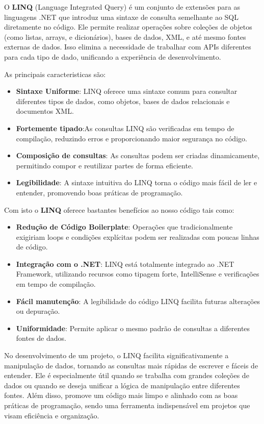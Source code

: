 \documentclass[11pt]{scrartcl} %
\begin{document}
O \textbf{LINQ} (Language Integrated Query) é um conjunto de extensões para as linguagens .NET que introduz uma sintaxe de consulta semelhante ao SQL diretamente no código. Ele permite realizar operações sobre coleções de objetos (como listas, arrays, e dicionários), bases de dados, XML, e até mesmo fontes externas de dados. Isso elimina a necessidade de trabalhar com APIs diferentes para cada tipo de dado, unificando a experiência de desenvolvimento.

As principais caracteristicas são:
\begin{itemize}
	\item \textbf{Sintaxe Uniforme}: 	LINQ oferece uma sintaxe comum para consultar diferentes tipos de dados, como objetos, bases de dados relacionais e documentos XML.
	\item \textbf{Fortemente tipado}:As consultas LINQ são verificadas em tempo de compilação, reduzindo erros e proporcionando maior segurança no código.
	\item \textbf{Composição de consultas}: As consultas podem ser criadas dinamicamente, permitindo compor e reutilizar partes de forma eficiente.
	\item \textbf{Legibilidade}: A sintaxe intuitiva do LINQ torna o código mais fácil de ler e entender, promovendo boas práticas de programação.
\end{itemize}

Com isto o \textbf{LINQ} oferece bastantes benefícios ao nosso código tais como:
\begin{itemize}
	\item \textbf{Redução de Código Boilerplate}: Operações que tradicionalmente exigiriam loops e condições explícitas podem ser realizadas com poucas linhas de código.
	\item \textbf{Integração com o .NET}: LINQ está totalmente integrado ao .NET Framework, utilizando recursos como tipagem forte, IntelliSense e verificações em tempo de compilação.
	\item \textbf{Fácil manutenção}: A legibilidade do código LINQ facilita futuras alterações ou depuração.
	\item \textbf{Uniformidade}: Permite aplicar o mesmo padrão de consultas a diferentes fontes de dados.
\end{itemize}

No desenvolvimento de um projeto, o LINQ facilita significativamente a manipulação de dados, tornando as consultas mais rápidas de escrever e fáceis de entender. Ele é especialmente útil quando se trabalha com grandes coleções de dados ou quando se deseja unificar a lógica de manipulação entre diferentes fontes. Além disso, promove um código mais limpo e alinhado com as boas práticas de programação, sendo uma ferramenta indispensável em projetos que visam eficiência e organização.
\end{document}
